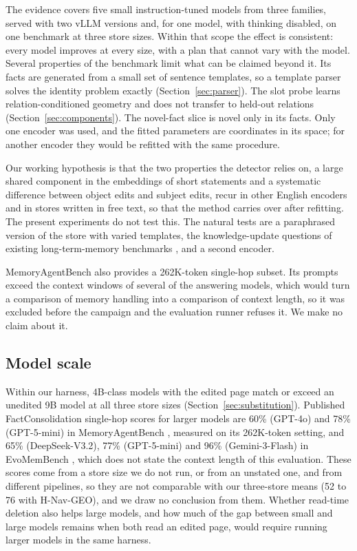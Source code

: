 \documentclass{CUP-JNL-NLP}
\newcommand{\geo}{H-Nav-GEO}
\begin{document}
The evidence covers five small instruction-tuned models from three families, served with two vLLM versions and, for one model, with thinking disabled, on one benchmark at three store sizes. Within that scope the effect is consistent: every model improves at every size, with a plan that cannot vary with the model. Several properties of the benchmark limit what can be claimed beyond it. Its facts are generated from a small set of sentence templates, so a template parser solves the identity problem exactly (Section~\ref{sec:parser}). The slot probe learns relation-conditioned geometry and does not transfer to held-out relations (Section~\ref{sec:components}). The novel-fact slice is novel only in its facts. Only one encoder was used, and the fitted parameters are coordinates in its space; for another encoder they would be refitted with the same procedure.

Our working hypothesis is that the two properties the detector relies on, a large shared component in the embeddings of short statements and a systematic difference between object edits and subject edits, recur in other English encoders and in stores written in free text, so that the method carries over after refitting. The present experiments do not test this. The natural tests are a paraphrased version of the store with varied templates, the knowledge-update questions of existing long-term-memory benchmarks \citep{wu2025longmemeval}, and a second encoder.

MemoryAgentBench also provides a 262K-token single-hop subset. Its prompts exceed the context windows of several of the answering models, which would turn a comparison of memory handling into a comparison of context length, so it was excluded before the campaign and the evaluation runner refuses it. We make no claim about it.

\subsection{Model scale}
\label{sec:scale}

Within our harness, 4B-class models with the edited page match or exceed an unedited 9B model at all three store sizes (Section~\ref{sec:substitution}). Published FactConsolidation single-hop scores for larger models are 60\% (GPT-4o) and 78\% (GPT-5-mini) in MemoryAgentBench \citep{hu2026memoryagentbench}, measured on its 262K-token setting, and 65\% (DeepSeek-V3.2), 77\% (GPT-5-mini) and 96\% (Gemini-3-Flash) in EvoMemBench \citep{wang2026evomembench}, which does not state the context length of this evaluation. %
These scores come from a store size we do not run, or from an unstated one, and from different pipelines, so they are not comparable with our three-store means (52 to 76 with \geo{}), and we draw no conclusion from them. Whether read-time deletion also helps large models, and how much of the gap between small and large models remains when both read an edited page, would require running larger models in the same harness.
\end{document}
